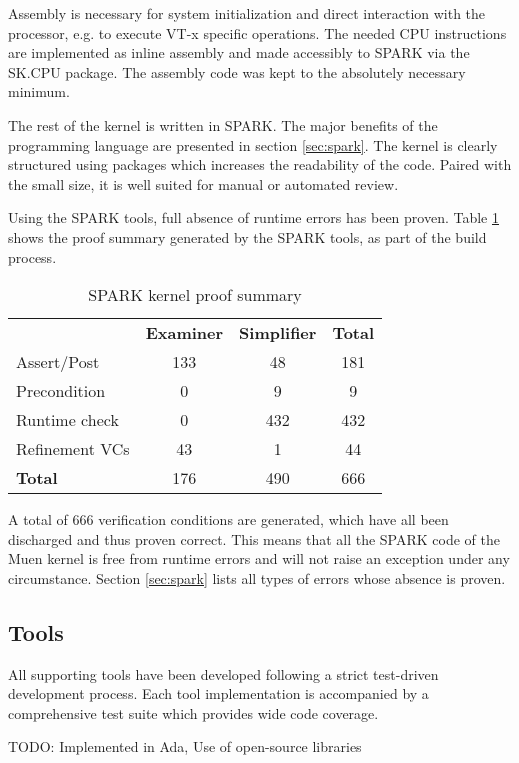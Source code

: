 Assembly is necessary for system initialization and direct interaction with the
processor, e.g. to execute VT-x specific operations. The needed CPU instructions
are implemented as inline assembly and made accessibly to SPARK via the SK.CPU
package. The assembly code was kept to the absolutely necessary minimum.

The rest of the kernel is written in SPARK. The major benefits of the
programming language are presented in section \ref{sec:spark}. The kernel is
clearly structured using packages which increases the readability of the code.
Paired with the small size, it is well suited for manual or automated review.

Using the SPARK tools, full absence of runtime errors has been proven. Table
\ref{tab:kernel-proof-sum} shows the proof summary generated by the SPARK tools,
as part of the build process.

\begin{table}[h]
	\centering
	\begin{tabular}{l c c c}
		& \textbf{Examiner} & \textbf{Simplifier} & \textbf{Total} \\
		Assert/Post    & 133 & 48  & 181 \\
		Precondition   & 0   & 9   & 9   \\
		Runtime check  & 0   & 432 & 432 \\
		Refinement VCs & 43  & 1   & 44 \\
		\hline
		\textbf{Total} & 176 & 490 & 666 \\
	\end{tabular}
	\caption{SPARK kernel proof summary}
	\label{tab:kernel-proof-sum}
\end{table}

A total of 666 verification conditions are generated, which have all been
discharged and thus proven correct. This means that all the SPARK code of the
Muen kernel is free from runtime errors and will not raise an exception under
any circumstance. Section \ref{sec:spark} lists all types of errors whose
absence is proven.

\subsection{Tools}
All supporting tools have been developed following a strict test-driven
development process. Each tool implementation is accompanied by a comprehensive
test suite which provides wide code coverage.

TODO: Implemented in Ada, Use of open-source libraries

